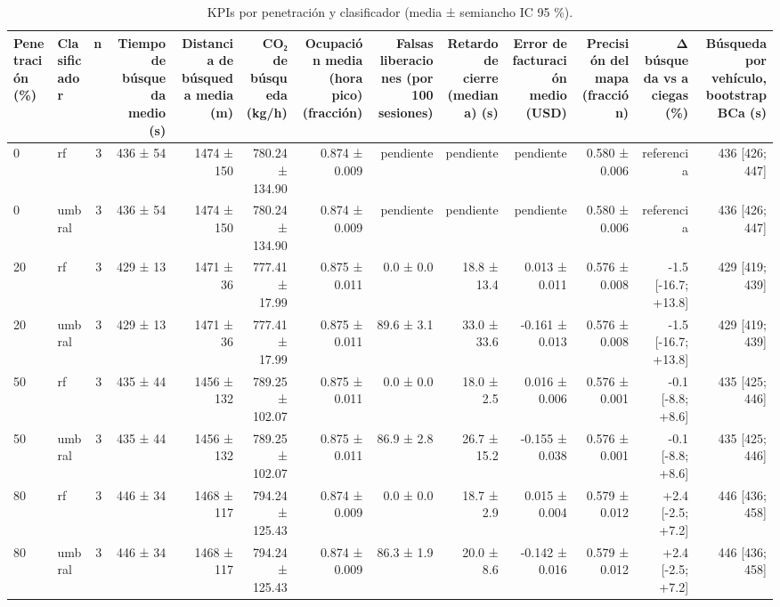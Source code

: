 \begin{table}
\caption{KPIs por penetración y clasificador (media ± semiancho IC 95 \%).}
\label{tab:kpis}
\begin{tabular}{llrrrrrrrrrrr}
\toprule
Penetración (\%) & Clasificador & n & Tiempo de búsqueda medio (s) & Distancia de búsqueda media (m) & CO₂ de búsqueda (kg/h) & Ocupación media (hora pico) (fracción) & Falsas liberaciones (por 100 sesiones) & Retardo de cierre (mediana) (s) & Error de facturación medio (USD) & Precisión del mapa (fracción) & Δ búsqueda vs a ciegas (\%) & Búsqueda por vehículo, bootstrap BCa (s) \\
\midrule
0 & rf & 3 & 436 ± 54 & 1474 ± 150 & 780.24 ± 134.90 & 0.874 ± 0.009 & pendiente & pendiente & pendiente & 0.580 ± 0.006 & referencia & 436 [426; 447] \\
0 & umbral & 3 & 436 ± 54 & 1474 ± 150 & 780.24 ± 134.90 & 0.874 ± 0.009 & pendiente & pendiente & pendiente & 0.580 ± 0.006 & referencia & 436 [426; 447] \\
20 & rf & 3 & 429 ± 13 & 1471 ± 36 & 777.41 ± 17.99 & 0.875 ± 0.011 & 0.0 ± 0.0 & 18.8 ± 13.4 & 0.013 ± 0.011 & 0.576 ± 0.008 & -1.5 [-16.7; +13.8] & 429 [419; 439] \\
20 & umbral & 3 & 429 ± 13 & 1471 ± 36 & 777.41 ± 17.99 & 0.875 ± 0.011 & 89.6 ± 3.1 & 33.0 ± 33.6 & -0.161 ± 0.013 & 0.576 ± 0.008 & -1.5 [-16.7; +13.8] & 429 [419; 439] \\
50 & rf & 3 & 435 ± 44 & 1456 ± 132 & 789.25 ± 102.07 & 0.875 ± 0.011 & 0.0 ± 0.0 & 18.0 ± 2.5 & 0.016 ± 0.006 & 0.576 ± 0.001 & -0.1 [-8.8; +8.6] & 435 [425; 446] \\
50 & umbral & 3 & 435 ± 44 & 1456 ± 132 & 789.25 ± 102.07 & 0.875 ± 0.011 & 86.9 ± 2.8 & 26.7 ± 15.2 & -0.155 ± 0.038 & 0.576 ± 0.001 & -0.1 [-8.8; +8.6] & 435 [425; 446] \\
80 & rf & 3 & 446 ± 34 & 1468 ± 117 & 794.24 ± 125.43 & 0.874 ± 0.009 & 0.0 ± 0.0 & 18.7 ± 2.9 & 0.015 ± 0.004 & 0.579 ± 0.012 & +2.4 [-2.5; +7.2] & 446 [436; 458] \\
80 & umbral & 3 & 446 ± 34 & 1468 ± 117 & 794.24 ± 125.43 & 0.874 ± 0.009 & 86.3 ± 1.9 & 20.0 ± 8.6 & -0.142 ± 0.016 & 0.579 ± 0.012 & +2.4 [-2.5; +7.2] & 446 [436; 458] \\
\bottomrule
\end{tabular}
\end{table}

